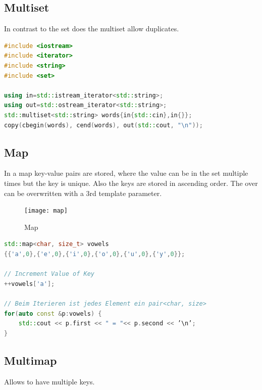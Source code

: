 \subsection{Multiset}
In contrast to the set does the multiset allow duplicates.
\begin{lstlisting}[language=C++]
#include <iostream>
#include <iterator>
#include <string>
#include <set>

using in=std::istream_iterator<std::string>;
using out=std::ostream_iterator<std::string>;
std::multiset<std::string> words{in{std::cin},in{}};
copy(cbegin(words), cend(words), out(std::cout, "\n"));
\end{lstlisting}

\subsection{Map}
In a map key-value pairs are stored, where the value can be in the set multiple times but the key is unique. Also the keys are stored in ascending order. The over can be overwritten with a 3rd template parameter.
\begin{figure}[h!]
  \centering
  \texttt{[image: map]}
  \caption{Map}
\end{figure}
\begin{lstlisting}[language=C++]
std::map<char, size_t> vowels
{{'a',0},{'e',0},{'i',0},{'o',0},{'u',0},{'y',0}};

// Increment Value of Key
++vowels['a'];

// Beim Iterieren ist jedes Element ein pair<char, size>
for(auto const &p:vowels) {
	std::cout << p.first << " = "<< p.second << ’\n’;
}
\end{lstlisting}

\subsection{Multimap}
Allows to have multiple keys.
